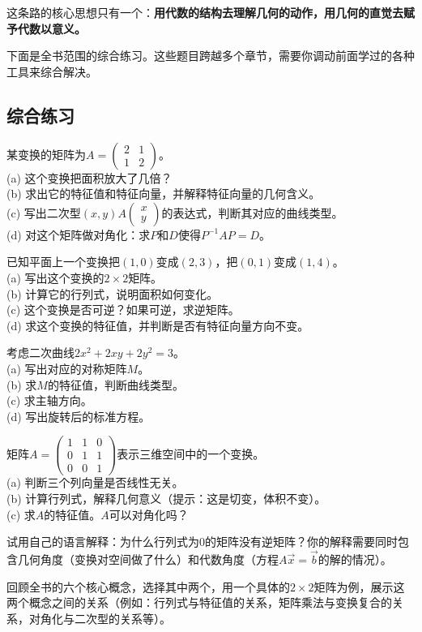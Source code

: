 这条路的核心思想只有一个：\textbf{用代数的结构去理解几何的动作，用几何的直觉去赋予代数以意义。}

下面是全书范围的综合练习。这些题目跨越多个章节，需要你调动前面学过的各种工具来综合解决。

\subsection*{综合练习}
\begin{exercise}
\item 某变换的矩阵为$A=\begin{pmatrix}2&1\\1&2\end{pmatrix}$。\\
(a) 这个变换把面积放大了几倍？\\
(b) 求出它的特征值和特征向量，并解释特征向量的几何含义。\\
(c) 写出二次型$(x,y)A\begin{pmatrix}x\\y\end{pmatrix}$的表达式，判断其对应的曲线类型。\\
(d) 对这个矩阵做对角化：求$P$和$D$使得$P^{-1}AP=D$。
\item 已知平面上一个变换把$(1,0)$变成$(2,3)$，把$(0,1)$变成$(1,4)$。\\
(a) 写出这个变换的$2\times2$矩阵。\\
(b) 计算它的行列式，说明面积如何变化。\\
(c) 这个变换是否可逆？如果可逆，求逆矩阵。\\
(d) 求这个变换的特征值，并判断是否有特征向量方向不变。
\item 考虑二次曲线$2x^2+2xy+2y^2=3$。\\
(a) 写出对应的对称矩阵$M$。\\
(b) 求$M$的特征值，判断曲线类型。\\
(c) 求主轴方向。\\
(d) 写出旋转后的标准方程。
\item 矩阵$A=\begin{pmatrix}1&1&0\\0&1&1\\0&0&1\end{pmatrix}$表示三维空间中的一个变换。\\
(a) 判断三个列向量是否线性无关。\\
(b) 计算行列式，解释几何意义（提示：这是切变，体积不变）。\\
(c) 求$A$的特征值。$A$可以对角化吗？
\item 试用自己的语言解释：为什么行列式为$0$的矩阵没有逆矩阵？你的解释需要同时包含几何角度（变换对空间做了什么）和代数角度（方程$A\vec x=\vec b$的解的情况）。
\item 回顾全书的六个核心概念，选择其中两个，用一个具体的$2\times2$矩阵为例，展示这两个概念之间的关系（例如：行列式与特征值的关系，矩阵乘法与变换复合的关系，对角化与二次型的关系等）。
\end{exercise}

